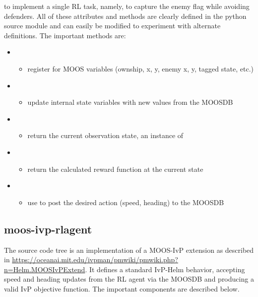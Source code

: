 \documentclass[onecolumn,letterpaper,11pt]{article}
\begin{document}
\begin{description}
  to implement a single RL task, namely, to capture the enemy flag while
  avoiding defenders. All of these attributes and methods are clearly defined in the
  python source module and can easily be modified to experiment with alternate
  definitions. The important methods are:
  \begin{itemize}
  \item {}
    \begin{itemize}
    \item register for MOOS variables (ownship, x, y, enemy x, y, tagged state, etc.)
    \end{itemize}
  \item {}
    \begin{itemize}
    \item update internal state variables with new values from the MOOSDB
    \end{itemize}
  \item {}
    \begin{itemize}
    \item return the current observation state, an instance of 
    \end{itemize}
  \item {}
    \begin{itemize}
    \item return the calculated reward function at the current state
    \end{itemize}
  \item {}
    \begin{itemize}
    \item use  to post the desired action
      (speed, heading) to the MOOSDB
    \end{itemize}
  \end{itemize}
\end{description}

\subsection{moos-ivp-rlagent}

The  source code tree is an implementation of a
MOOS-IvP extension as described in
\url{https://oceanai.mit.edu/ivpman/pmwiki/pmwiki.php?n=Helm.MOOSIvPExtend}. It
defines a standard IvP-Helm behavior, accepting speed and heading
updates from the  RL agent via the MOOSDB and producing
a valid IvP objective function. The important components are described below.
\end{document}
